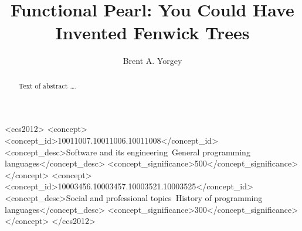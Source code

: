 \documentclass[acmsmall,review]{acmart}\settopmatter{printfolios=true,printccs=false,printacmref=false}
\begin{document}
\title{Functional Pearl: You Could Have Invented Fenwick Trees}



\author{Brent A. Yorgey}


\begin{abstract}
Text of abstract \ldots.
\end{abstract}


\begin{CCSXML}
<ccs2012>
<concept>
<concept_id>10011007.10011006.10011008</concept_id>
<concept_desc>Software and its engineering~General programming languages</concept_desc>
<concept_significance>500</concept_significance>
</concept>
<concept>
<concept_id>10003456.10003457.10003521.10003525</concept_id>
<concept_desc>Social and professional topics~History of programming languages</concept_desc>
<concept_significance>300</concept_significance>
</concept>
</ccs2012>
\end{CCSXML}
\end{document}
